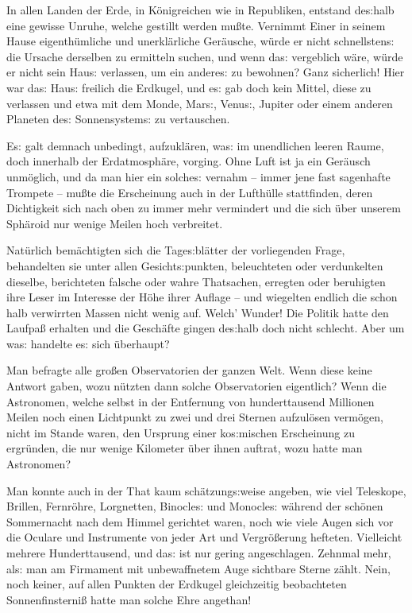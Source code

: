 \documentclass[oneside,12pt]{book}
\newcommand{\s}{s:}
\begin{document}
In allen Landen der Erde, in K\"onigreichen wie in Republiken,
entstand de{\s}halb eine gewisse Unruhe, welche gestillt werden
mu{\ss}te. Vernimmt Einer in seinem Hause eigenth\"umliche und
unerkl\"arliche Ger\"ausche, w\"urde er nicht schnellsten{\s} die
Ursache derselben zu ermitteln suchen, und wenn da{\s} vergeblich
w\"are, w\"urde er nicht sein Hau{\s} verlassen, um ein andere{\s} zu
bewohnen? Ganz sicherlich! Hier war da{\s} Hau{\s} freilich die
Erdkugel, und e{\s} gab doch kein Mittel, diese zu verlassen und etwa
mit dem Monde, Mar{\s}, Venu{\s}, Jupiter oder einem anderen Planeten
de{\s} Sonnensystem{\s} zu vertauschen.

E{\s} galt demnach unbedingt, aufzukl\"aren, wa{\s} im unendlichen
leeren Raume, doch innerhalb der Erdatmosph\"are, vorging. Ohne Luft
ist ja ein Ger\"ausch unm\"oglich, und da man hier ein solche{\s}
vernahm -- immer jene fast sagenhafte Trompete -- mu{\ss}te die
Erscheinung auch in der Lufth\"ulle stattfinden, deren Dichtigkeit
sich nach oben zu immer mehr vermindert und die sich \"uber unserem
Sph\"aroid nur wenige Meilen hoch verbreitet.

Nat\"urlich bem\"achtigten sich die Tage{\s}bl\"atter der
vorliegenden Frage, behandelten sie unter allen Gesicht{\s}punkten,
beleuchteten oder verdunkelten dieselbe, berichteten falsche oder
wahre Thatsachen, erregten oder beruhigten ihre Leser im Interesse
der H\"ohe ihrer Auflage -- und wiegelten endlich die schon halb
verwirrten Massen nicht wenig auf. Welch' Wunder! Die Politik hatte
den Laufpa{\ss} erhalten und die Gesch\"afte gingen de{\s}halb doch
nicht schlecht. Aber um wa{\s} handelte e{\s} sich \"uberhaupt?

Man befragte alle gro{\ss}en Observatorien der ganzen Welt. Wenn
diese keine Antwort gaben, wozu n\"utzten dann solche Observatorien
eigentlich? Wenn die Astronomen, welche selbst in der Entfernung von
hunderttausend Millionen Meilen noch einen Lichtpunkt zu zwei und
drei Sternen aufzul\"osen verm\"ogen, nicht im Stande waren, den
Ursprung einer ko{\s}mischen Erscheinung zu ergr\"unden, die nur
wenige Kilometer \"uber ihnen auftrat, wozu hatte man Astronomen?

Man konnte auch in der That kaum sch\"atzung{\s}weise angeben, wie
viel Teleskope, Brillen, Fernr\"ohre, Lorgnetten, Binocle{\s} und
Monocle{\s} w\"ahrend der sch\"onen Sommernacht nach dem Himmel
gerichtet waren, noch wie viele Augen sich vor die Oculare und
Instrumente von jeder Art und Vergr\"o{\ss}erung hefteten. Vielleicht
mehrere Hunderttausend, und da{\s} ist nur gering angeschlagen.
Zehnmal mehr, al{\s} man am Firmament mit unbewaffnetem Auge
sichtbare Sterne z\"ahlt. Nein, noch keiner, auf allen Punkten der
Erdkugel gleichzeitig beobachteten Sonnenfinsterni{\ss} hatte man
solche Ehre angethan!
\end{document}

